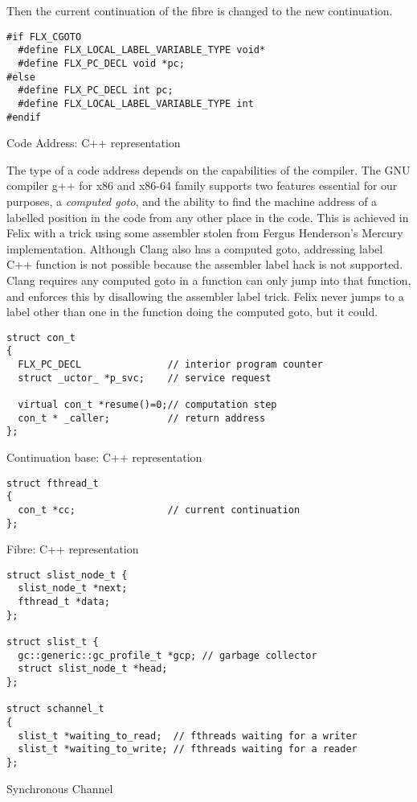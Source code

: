 \documentclass[oneside]{book}
\begin{document}
Then the current continuation of the fibre is 
changed to the new continuation.

\begin{listing}
\begin{verbatim}
#if FLX_CGOTO
  #define FLX_LOCAL_LABEL_VARIABLE_TYPE void*
  #define FLX_PC_DECL void *pc;
#else
  #define FLX_PC_DECL int pc;
  #define FLX_LOCAL_LABEL_VARIABLE_TYPE int
#endif
\end{verbatim}
\caption{Code Address: C++ representation}
\label{lst:code address}
\begin{framed}\small
The type of a code address depends on the capabilities of the compiler.
The GNU compiler g++ for x86 and x86-64 family 
supports two features essential for our purposes,
a {\em computed goto}, and the ability to find the machine address of a labelled
position in the code from any other place in the code. This is achieved
in Felix with a trick using some assembler stolen from Fergus Henderson's
Mercury implementation. Although Clang also has a computed goto, addressing
label C++ function is not possible because the assembler label hack
is not supported. Clang requires any computed goto in a function can
only jump into that function, and enforces this by disallowing
the assembler label trick. Felix never jumps to a label other than one
in the function doing the computed goto, but it could.
\end{framed}
\end{listing}

\begin{listing}
\begin{verbatim}
struct con_t 
{
  FLX_PC_DECL               // interior program counter
  struct _uctor_ *p_svc;    // service request

  virtual con_t *resume()=0;// computation step
  con_t * _caller;          // return address
};
\end{verbatim}
\caption{Continuation base: C++ representation}
\label{lst:continuation base}
\end{listing}

\begin{listing}
\begin{verbatim}
struct fthread_t 
{
  con_t *cc;                // current continuation
};
\end{verbatim}
\caption{Fibre: C++ representation}
\label{lst:fibre}
\end{listing}

\begin{listing}
\begin{verbatim}
struct slist_node_t {
  slist_node_t *next;
  fthread_t *data;
};

struct slist_t {
  gc::generic::gc_profile_t *gcp; // garbage collector
  struct slist_node_t *head;
};

struct schannel_t
{
  slist_t *waiting_to_read;  // fthreads waiting for a writer
  slist_t *waiting_to_write; // fthreads waiting for a reader
};
\end{verbatim}
\caption{Synchronous Channel}
\label{lst:synchronous channel}
\end{listing}
\end{document}
